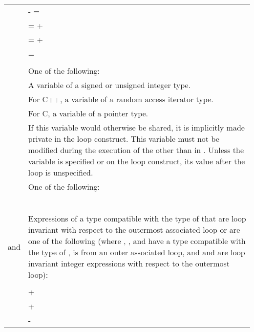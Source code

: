 \begin{ccppspecific}
\begin{supertabular}{ p{0.8in} p{4.5in}}
    & {} {-} = {}\\
    & {} = {} + {}\\
    & {} = {} + {}\\
    & {} = {} - {}\\
    & \\
    {} & One of the following:\\
    & \hspace{1.5em}A variable of a signed or unsigned integer type.\\
    & \hspace{1.5em}For C++, a variable of a random access iterator type.\\
    & \hspace{1.5em}For C, a variable of a pointer type.\\
    & If this variable would otherwise be shared, it is implicitly made private in the loop
    construct. This variable must not be modified during the execution of the {}
    other than in {}. Unless the variable is specified {}
    or {} on the loop construct, its value after the loop is unspecified.\\
    {} & One of the following:\\
    & {\scode{<}}\\
    & {\scode{<=}}\\
    & {\scode{>}}\\
    & {\scode{>=}}\\
    & {\scode{!=}}\\
    & \\
    {} and {} & Expressions of a type compatible with the
    type of {} that are loop invariant with respect to the outermost
    associated loop or are one of the following (where {},
    {}, and {} have a type compatible with the type of
    {}, {} is {} from an outer associated
    loop, and {} and {} are loop invariant integer
    expressions with respect to the outermost loop): \\
    & {} \\
    & {} + {} \\
    & {} + {} \\
    & {} - {} \\

\end{supertabular}
\end{ccppspecific}
